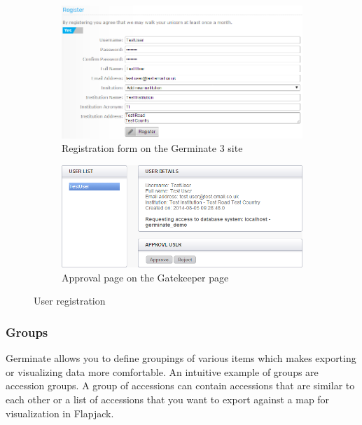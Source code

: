 \begin{figure}
    \centering
    \begin{subfigure}[b]{0.475\textwidth}
        \centering
        \includegraphics[width=1.0\textwidth]{img/features/registration.png}
        \caption{Registration form on the Germinate 3 site}
        \label{fig:user_registration_registration}
    \end{subfigure}
    \hspace*{0.5cm}
    \begin{subfigure}[b]{0.475\textwidth}
        \centering
        \includegraphics[width=1.0\textwidth]{img/features/registration-approve.png}
        \caption{Approval page on the Gatekeeper page}
        \label{fig:user_registration_approval}
    \end{subfigure}
    \caption{User registration}
    \label{fig:user_registration}
\end{figure}

\subsubsection{Groups}
Germinate allows you to define groupings of various items which makes exporting or visualizing data more comfortable. An intuitive example of groups are accession groups. A group of accessions can contain accessions that are similar to each other or a list of accessions that you want to export against a map for visualization in Flapjack.

